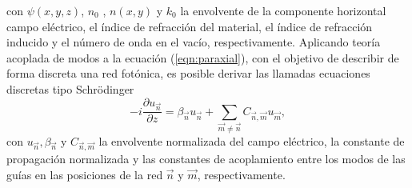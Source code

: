 con $\psi(x,y,z)$, $n_0$ , $n(x,y)$ y $k_0$ la envolvente de la componente horizontal campo eléctrico, el índice de refracción del material, el índice de refracción inducido y el número de onda en el vacío, respectivamente. Aplicando teoría acoplada de modos \cite{coupledmodetheory} a la ecuación (\ref{eqn:paraxial}), con el objetivo de describir de forma discreta una red fotónica, es posible derivar las llamadas ecuaciones discretas tipo Schrödinger \cite{discretesolitons, artificialFB, FBdynamics}
\begin{equation}
	-i\frac{\partial u_{\vec{n}} }{\partial z} = \beta_{\vec{n}}u_{\vec{n}} + \sum_{\vec{m}\neq\vec{n}} C_{\vec{n},\vec{m}}u_{\vec{m}}, \label{eqn:CMT}
\end{equation}
con $u_{\vec{n}}, \beta_{\vec{n}}$ y $C_{\vec{n}, \vec{m}}$ la envolvente normalizada del campo eléctrico, la constante de propagación normalizada y las constantes de acoplamiento entre los modos de las guías en las posiciones de la red $\vec{n}$ y $\vec{m}$, respectivamente.